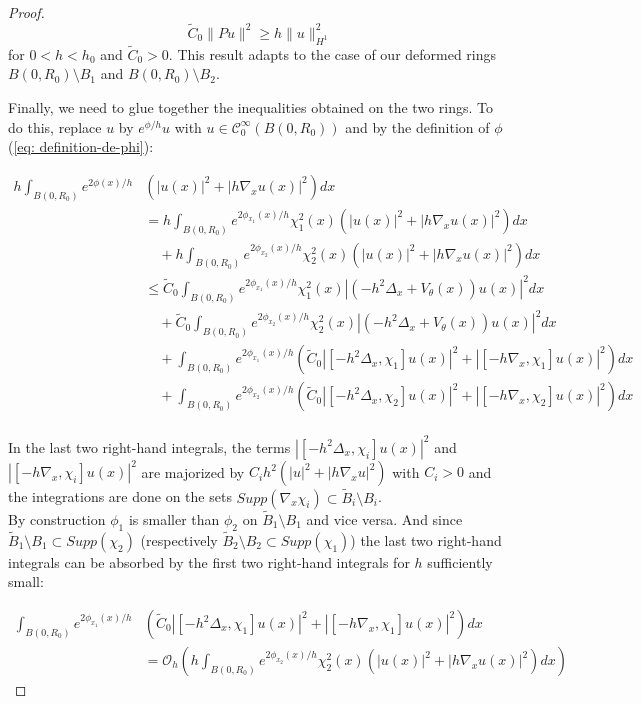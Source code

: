 \documentclass[leqno,11pt,letterpaper, english]{amsart}
\newcommand{\nn}{\nonumber}
\theoremstyle{plain}
\theoremstyle{definition}
\numberwithin{equation}{section}
\begin{document}
\begin{proof}
\begin{equation}
 \tilde{C}_0\lVert Pu\rVert^2 \geq h \|u\|_{H^1}^2
\end{equation}
for $0<h<h_0$ and $\tilde{C}_0>0$. This result adapts to the case of our deformed rings $B(0,R_0)\setminus B_1$ and $B(0,R_0)\setminus B_2$.

Finally, we need to glue together the inequalities obtained on the two rings. To do this, replace $u$ by $e^{\phi/h}u$ with $u\in \mathcal{C}_0^\infty(B(0,R_0))$ and by the definition of $\phi$ (\ref{eq: definition-de-phi}):

\begin{align}
    h\int_{B(0,R_0)} e^{2\phi(x)/h} &(|u(x)|^2 +|h\nabla_x u(x)|^2)dx \nn\\
    &= h\int_{B(0,R_0)} e^{2\phi_{x_1}(x)/h} \chi_1^2(x) (|u(x)|^2 +|h\nabla_x u(x)|^2)dx \nn\\
    &\quad +h\int_{B(0,R_0)} e^{2\phi_{x_2}(x)/h} \chi_2^2(x) (|u(x)|^2 +|h\nabla_x u(x)|^2)dx\nn\\
    &\leq \tilde{C}_0\int_{B(0,R_0)} e^{2\phi_{x_1}(x)/h} \chi_1^2(x) |(-h^2\Delta_x +V_{\theta}(x))u(x)|^2 dx   \nn\\
    &\quad + \tilde{C}_0\int_{B(0,R_0)} e^{2\phi_{x_2}(x)/h} \chi_2^2(x) |(-h^2\Delta_x +V_{\theta}(x))u(x)|^2 dx   \nn\\
    &\quad +  \int_{B(0,R_0)} e^{2\phi_{x_1}(x)/h}  (\tilde{C}_0|[-h^2\Delta_x, \chi_1]u(x)|^2 + |[-h\nabla_x, \chi_1]u(x)|^2)dx   \nn\\
    &\quad+  \int_{B(0,R_0)} e^{2\phi_{x_2}(x)/h}  (\tilde{C}_0|[-h^2\Delta_x, \chi_2]u(x)|^2 + |[-h\nabla_x, \chi_2]u(x)|^2) dx   \nn\\
\end{align}

In the last two right-hand integrals, the terms $|[-h^2\Delta_x, \chi_i]u(x)|^2$ and $|[-h\nabla_x, \chi_i]u(x)|^2$ are majorized by $C_i h^2 (|u|^2 +|h\nabla_x u|^2)$ with $C_i>0$ and the integrations are done on the sets $Supp(\nabla_x \chi_i)\subset \tilde{B}_i\setminus B_i$.\\
 By construction $\phi_1$ is smaller than $\phi_2$ on $ \tilde{B}_1\setminus B_1$ and vice versa. And since $ \tilde{B}_1\setminus B_1 \subset Supp(\chi_2)$ (respectively $ \tilde{B}_2\setminus B_2 \subset Supp(\chi_1)$) the last two right-hand integrals can be absorbed by the first two right-hand integrals for $h$ sufficiently small:

\begin{align}
\int_{B(0,R_0)} e^{2\phi_{x_1}(x)/h}  &(\tilde{C}_0|[-h^2\Delta_x, \chi_1]u(x)|^2 + |[-h\nabla_x, \chi_1]u(x)|^2)dx \nn\\
&=\mathcal{O}_h \left(h\int_{B(0,R_0)} e^{2\phi_{x_2}(x)/h} \chi_2^2(x) (|u(x)|^2 +|h\nabla_x u(x)|^2)dx \right)
\end{align}


\end{proof}
\end{document}
